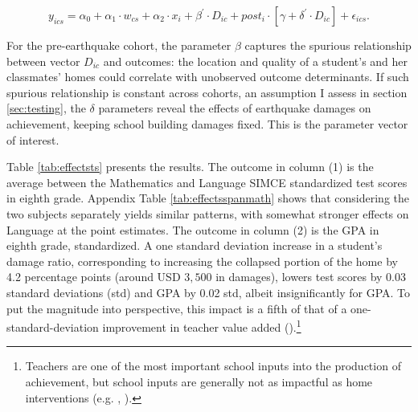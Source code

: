 \begin{equation}\label{regression1}
    y_{ics}=\alpha_0 +\alpha_1\cdot w_{cs} + \alpha_2\cdot  x_i + \beta^{'}\cdot  D_{ic}+  post_i\cdot \left[ \gamma + \delta^{'}\cdot D_{ic}\right] +\epsilon_{ics}.
\end{equation}


 For the pre-earthquake cohort, the parameter $\beta$ captures the spurious relationship between vector $D_{ic}$ and outcomes: the location and quality of a student's and her classmates' homes could correlate with unobserved outcome determinants. If such spurious relationship is constant across cohorts, an assumption I assess in section \ref{sec:testing}, the $\delta$ parameters reveal the effects of earthquake damages on achievement, keeping school building damages fixed. This is the parameter vector of interest. \par 

Table \ref{tab:effectsts} presents the results. The outcome in column (1) is the average between the Mathematics and Language SIMCE standardized test scores in eighth grade. Appendix Table \ref{tab:effectsspanmath} shows that considering the two subjects separately yields similar patterns, with somewhat stronger effects on Language at the point estimates. The outcome in column (2) is the GPA in eighth grade, standardized. A one standard deviation increase in a student's damage ratio, corresponding to increasing the collapsed portion of the home by 4.2 percentage points (around USD $3,500$ in damages), lowers test scores by 0.03 standard deviations (std) and GPA by 0.02 std, albeit insignificantly for GPA. To put the magnitude into perspective, this impact is a fifth of that of a one-standard-deviation improvement in teacher value added (\cite{chetty2014measuring}).\footnote{Teachers are one of the most important school inputs into the production of achievement, but school inputs are generally not as impactful as home interventions (e.g. \cite*{zhou2022impacts}, \cite{heckman2006skill}).}\par 





